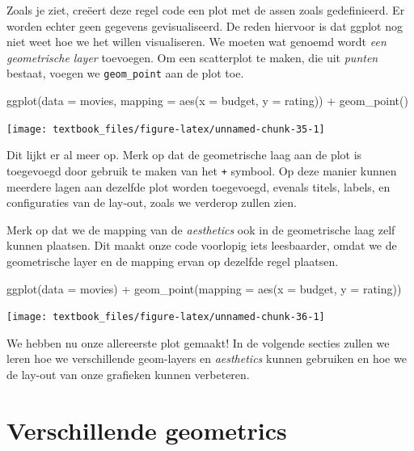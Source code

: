 \documentclass[]{tufte-book}
\newenvironment{Shaded}{}{}
\newcommand{\AttributeTok}[1]{\textcolor[rgb]{0.49,0.56,0.16}{#1}}
\newcommand{\FunctionTok}[1]{\textcolor[rgb]{0.02,0.16,0.49}{#1}}
\newcommand{\NormalTok}[1]{#1}
\newcommand{\SpecialCharTok}[1]{\textcolor[rgb]{0.25,0.44,0.63}{#1}}
\begin{document}
Zoals je ziet, creëert deze regel code een plot met de assen zoals gedefinieerd. Er worden echter geen gegevens gevisualiseerd. De reden hiervoor is dat ggplot nog niet weet hoe we het willen visualiseren. We moeten wat genoemd wordt \emph{een geometrische layer} toevoegen. Om een scatterplot te maken, die uit \emph{punten} bestaat, voegen we \texttt{geom\_point} aan de plot toe.

\begin{Shaded}
\begin{Highlighting}[]
\FunctionTok{ggplot}\NormalTok{(}\AttributeTok{data =}\NormalTok{ movies, }\AttributeTok{mapping =} \FunctionTok{aes}\NormalTok{(}\AttributeTok{x =}\NormalTok{ budget, }\AttributeTok{y =}\NormalTok{ rating)) }\SpecialCharTok{+}
  \FunctionTok{geom\_point}\NormalTok{()}
\end{Highlighting}
\end{Shaded}

\texttt{[image: textbook\_files/figure-latex/unnamed-chunk-35-1]}

Dit lijkt er al meer op. Merk op dat de geometrische laag aan de plot is toegevoegd door gebruik te maken van het \texttt{+} symbool. Op deze manier kunnen meerdere lagen aan dezelfde plot worden toegevoegd, evenals titels, labels, en configuraties van de lay-out, zoals we verderop zullen zien.

Merk op dat we de mapping van de \emph{aesthetics} ook in de geometrische laag zelf kunnen plaatsen. Dit maakt onze code voorlopig iets leesbaarder, omdat we de geometrische layer en de mapping ervan op dezelfde regel plaatsen.

\begin{Shaded}
\begin{Highlighting}[]
\FunctionTok{ggplot}\NormalTok{(}\AttributeTok{data =}\NormalTok{ movies) }\SpecialCharTok{+}
  \FunctionTok{geom\_point}\NormalTok{(}\AttributeTok{mapping =} \FunctionTok{aes}\NormalTok{(}\AttributeTok{x =}\NormalTok{ budget, }\AttributeTok{y =}\NormalTok{ rating))}
\end{Highlighting}
\end{Shaded}

\texttt{[image: textbook\_files/figure-latex/unnamed-chunk-36-1]}

We hebben nu onze allereerste plot gemaakt! In de volgende secties zullen we leren hoe we verschillende geom-layers en \emph{aesthetics} kunnen gebruiken en hoe we de lay-out van onze grafieken kunnen verbeteren.

\hypertarget{verschillende-geometrics}{%
\section{Verschillende geometrics}\label{verschillende-geometrics}}
\end{document}
